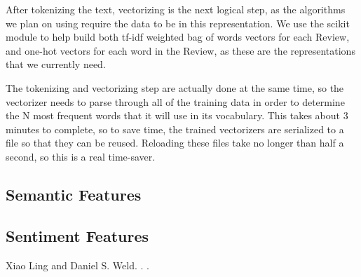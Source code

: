 \documentclass[11pt,letterpaper]{article}
\begin{document}
After tokenizing the text, vectorizing is the next logical step, as the algorithms we plan on using require the data to be in this representation. We use the scikit module to help build both tf-idf weighted bag of words vectors for each Review, and one-hot vectors for each word in the Review, as these are the representations that we currently need.

The tokenizing and vectorizing step are actually done at the same time, so the vectorizer needs to parse through all of the training data in order to determine the N most frequent words that it will use in its vocabulary. This takes about 3 minutes to complete, so to save time, the trained vectorizers are serialized to a file so that they can be reused. Reloading these files take no longer than half a second, so this is a real time-saver.


\subsection{Semantic Features}

\subsection{Sentiment Features}

\begin{thebibliography}{}

Xiao Ling and Daniel S. Weld.
.
.




\end{thebibliography}
\end{document}
